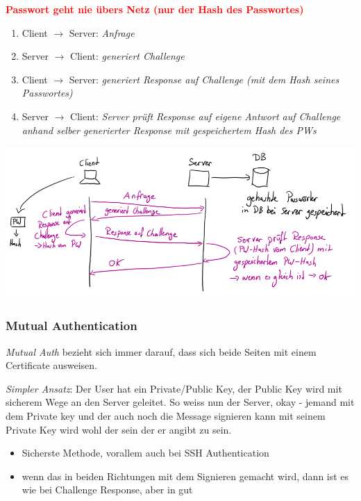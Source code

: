 \textcolor{red}{\textbf{Passwort geht nie übers Netz (nur der Hash des Passwortes)}}\\

\begin{enumerate}
    \item Client $\rightarrow$ Server: \textit{Anfrage}
    \item Server $\rightarrow$ Client: \textit{generiert Challenge}
    \item Client $\rightarrow$ Server: \textit{generiert Response auf Challenge (mit dem Hash seines Passwortes)}
    \item Server $\rightarrow$ Client: \textit{Server prüft Response auf eigene Antwort auf Challenge anhand selber generierter Response mit gespeichertem Hash des PWs}
\end{enumerate}
\begin{center}
    \includegraphics[width=1.0\linewidth]{./img/09-mitm/challenge_response}
    \vspace{-8pt}
\end{center}

\subsubsection{Mutual Authentication}
\textit{Mutual Auth} bezieht sich immer darauf, dass sich beide Seiten mit einem Certificate ausweisen.

\textit{Simpler Ansatz}: Der User hat ein Private/Public Key, der Public Key wird mit sicherem Wege an den Server geleitet. So weiss nun der Server, okay - jemand mit dem Private key und der auch noch die Message signieren kann mit seinem Private Key wird wohl der sein der er angibt zu sein.\\
\begin{itemize}
    \item Sicherste Methode, vorallem auch bei SSH Authentication
    \item wenn das in beiden Richtungen mit dem Signieren gemacht wird, dann ist es wie bei Challenge Response, aber in gut
\end{itemize}

